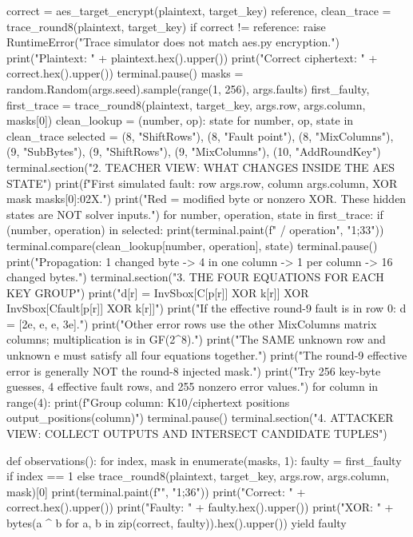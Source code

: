 \begin{lightcode}[numbers=left,firstnumber=1]
    correct = aes_target_encrypt(plaintext, target_key)
    reference, clean_trace = trace_round8(plaintext, target_key)
    if correct != reference:
        raise RuntimeError("Trace simulator does not match aes.py encryption.")
    print("Plaintext:          " + plaintext.hex().upper())
    print("Correct ciphertext: " + correct.hex().upper())
    terminal.pause()
    masks = random.Random(args.seed).sample(range(1, 256), args.faults)
    first_faulty, first_trace = trace_round8(plaintext, target_key, args.row, args.column, masks[0])
    clean_lookup = {(number, op): state for number, op, state in clean_trace}
    selected = {(8, "ShiftRows"), (8, "Fault point"), (8, "MixColumns"), (9, "SubBytes"), (9, "ShiftRows"), (9, "MixColumns"), (10, "AddRoundKey")}
    terminal.section("2. TEACHER VIEW: WHAT CHANGES INSIDE THE AES STATE")
    print(f"First simulated fault: row {args.row}, column {args.column}, XOR mask {masks[0]:02X}.")
    print("Red = modified byte or nonzero XOR. These hidden states are NOT solver inputs.")
    for number, operation, state in first_trace:
        if (number, operation) in selected:
            print(terminal.paint(f" / {operation}", "1;33"))
            terminal.compare(clean_lookup[number, operation], state)
            terminal.pause()
    print("Propagation: 1 changed byte -> 4 in one column -> 1 per column -> 16 changed bytes.")
    terminal.section("3. THE FOUR EQUATIONS FOR EACH KEY GROUP")
    print("d[r] = InvSbox[C[p[r]] XOR k[r]] XOR InvSbox[Cfault[p[r]] XOR k[r]]")
    print("If the effective round-9 fault is in row 0: d = [2e, e, e, 3e].")
    print("Other error rows use the other MixColumns matrix columns; multiplication is in GF(2^8).")
    print("The SAME unknown row and unknown e must satisfy all four equations together.")
    print("The round-9 effective error is generally NOT the round-8 injected mask.")
    print("Try 256 key-byte guesses, 4 effective fault rows, and 255 nonzero error values.")
    for column in range(4):
        print(f"Group {column}: K10/ciphertext positions {output_positions(column)}")
    terminal.pause()
    terminal.section("4. ATTACKER VIEW: COLLECT OUTPUTS AND INTERSECT CANDIDATE TUPLES")

    def observations():
        for index, mask in enumerate(masks, 1):
            faulty = first_faulty if index == 1 else trace_round8(plaintext, target_key, args.row, args.column, mask)[0]
            print(terminal.paint(f"", "1;36"))
            print("Correct: " + correct.hex().upper())
            print("Faulty:  " + faulty.hex().upper())
            print("XOR:     " + bytes(a ^ b for a, b in zip(correct, faulty)).hex().upper())
            yield faulty


\end{lightcode}
